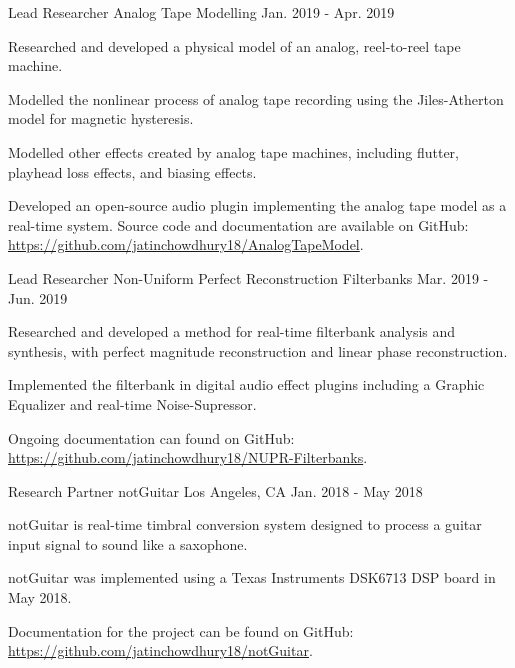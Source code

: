 \begin{cventries}
    \cventry
    {Lead Researcher} %
    {Analog Tape Modelling} %
    {} %
    {Jan. 2019 - Apr. 2019} %
    {
        \begin{cvitems}
              \item{Researched and developed a physical model of an analog, reel-to-reel tape machine.}
              \item{Modelled the nonlinear process of analog tape recording using the Jiles-Atherton model for magnetic hysteresis.}
              \item{Modelled other effects created by analog tape machines, including flutter, playhead loss effects, and biasing effects.}
              \item{Developed an open-source audio plugin implementing the analog tape model as a real-time system.
                    Source code and documentation are available on GitHub: \url{https://github.com/jatinchowdhury18/AnalogTapeModel}.}
        \end{cvitems}
    }

    \cventry
    {Lead Researcher} %
    {Non-Uniform Perfect Reconstruction Filterbanks} %
    {} %
    {Mar. 2019 - Jun. 2019} %
    {
      \begin{cvitems} %
        \item {Researched and developed a method for real-time filterbank analysis and synthesis, with perfect magnitude reconstruction and linear phase reconstruction.}
        \item {Implemented the filterbank in digital audio effect plugins including a Graphic Equalizer and real-time Noise-Supressor.}
        \item {Ongoing documentation can found on GitHub: \url{https://github.com/jatinchowdhury18/NUPR-Filterbanks}.}
      \end{cvitems}
    }

    \cventry
    {Research Partner} %
    {notGuitar} %
    {Los Angeles, CA} %
    {Jan. 2018 - May 2018} %
    {
      \begin{cvitems} %
        \item {notGuitar is real-time timbral conversion system designed to process a guitar input signal to sound like a saxophone.}
        \item {notGuitar was implemented using a Texas Instruments DSK6713 DSP board in May 2018.}
        \item {Documentation for the project can be found on GitHub: \url{https://github.com/jatinchowdhury18/notGuitar}.}
      \end{cvitems}
    }

\end{cventries}
